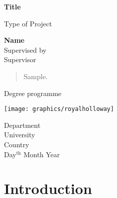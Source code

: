 \documentclass[12pt, bibliography=numbered]{article}%
\begin{document}
%
\begin{titlepage}%
    \begin{center}%
        \vspace*{0.1cm}
 
        \Huge
        \textbf{Title}
 
        \vspace{0.1cm}
        \LARGE
        Type of Project
 
        \vspace{0.5cm}
 
        \textbf{Name}\\
        \vspace{0.5cm}
        \normalsize
        Supervised by\\ Supervisor
        \vspace{0.7cm}
        \begin{abstract}
        Sample.
        \end{abstract}
        \vfill
 
        Degree programme
 
        \vspace{0.1cm}
 
        \texttt{[image: graphics/royalholloway]}
 
        \Large
        Department\\
        University\\
        Country\\
        Day$^\mathrm{th}$ Month Year
 
    \end{center}%
\end{titlepage}%
\thispagestyle{empty}
\clearpage\mbox{}\clearpage
\setcounter{page}{1}
\tableofcontents%
\pagebreak
\section{Introduction}

\clearpage
{}%
%
\end{document}
